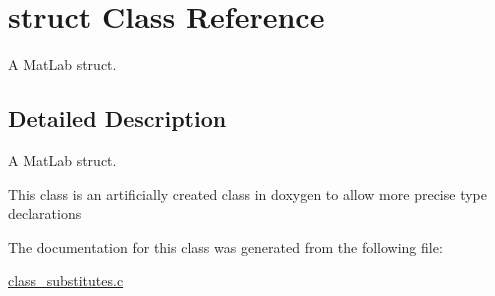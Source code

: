 \hypertarget{classstruct}{\section{struct Class Reference}
\label{classstruct}
}


A Mat\-Lab struct.  




\subsection{Detailed Description}
A Mat\-Lab struct. 

This class is an artificially created class in doxygen to allow more precise type declarations 

The documentation for this class was generated from the following file\-:\begin{DoxyCompactItemize}
\item 
\hyperlink{class__substitutes_8c}{class\-\_\-substitutes.\-c}\end{DoxyCompactItemize}
